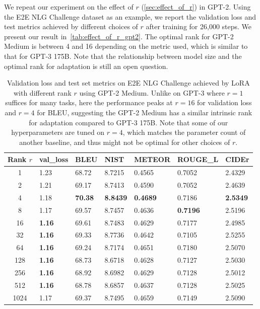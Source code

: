 \documentclass{article} %
\begin{document}
We repeat our experiment on the effect of $r$ (\autoref{sec:effect_of_r}) in GPT-2.
Using the E2E NLG Challenge dataset as an example, we report the validation loss and test metrics achieved by different choices of $r$ after training for 26,000 steps.
We present our result in~\autoref{tab:effect_of_r_gpt2}.
The optimal rank for GPT-2 Medium is between 4 and 16 depending on the metric used, which is similar to that for GPT-3 175B.
Note that the relationship between model size and the optimal rank for adaptation is still an open question.

\begin{table}[h]
  \centering
  \begin{tabular}{c|llllll}
  \toprule
Rank $r$& val\_loss     & BLEU            & NIST            & METEOR          & ROUGE\_L        & CIDEr           \\
\midrule
1    & 1.23          & 68.72          & 8.7215          & 0.4565          & 0.7052          & 2.4329          \\
2    & 1.21          & 69.17          & 8.7413          & 0.4590          & 0.7052          & 2.4639          \\
4    & 1.18          & \textbf{70.38} & \textbf{8.8439} & \textbf{0.4689} & 0.7186          & \textbf{2.5349} \\
8    & 1.17          & 69.57          & 8.7457          & 0.4636          & \textbf{0.7196} & 2.5196          \\
16   & \textbf{1.16} & 69.61          & 8.7483          & 0.4629          & 0.7177          & 2.4985          \\
32   & \textbf{1.16} & 69.33          & 8.7736          & 0.4642          & 0.7105          & 2.5255          \\
64   & \textbf{1.16} & 69.24          & 8.7174          & 0.4651          & 0.7180          & 2.5070          \\
128  & \textbf{1.16} & 68.73          & 8.6718          & 0.4628          & 0.7127          & 2.5030          \\
256  & \textbf{1.16} & 68.92          & 8.6982          & 0.4629          & 0.7128          & 2.5012          \\
512  & \textbf{1.16} & 68.78          & 8.6857          & 0.4637          & 0.7128          & 2.5025          \\
1024 & 1.17          & 69.37          & 8.7495          & 0.4659          & 0.7149          & 2.5090          \\
  \bottomrule
  \end{tabular}
  \caption{Validation loss and test set metrics on E2E NLG Challenge achieved by LoRA with different rank $r$ using GPT-2 Medium. Unlike on GPT-3 where $r=1$ suffices for many tasks, here the performance peaks at $r=16$ for validation loss and $r=4$ for BLEU, suggesting the GPT-2 Medium has a similar intrinsic rank for adaptation compared to GPT-3 175B. Note that some of our hyperparameters are tuned on $r=4$, which matches the parameter count of another baseline, and thus might not be optimal for other choices of $r$.}
  \label{tab:effect_of_r_gpt2}
\end{table}
\end{document}
